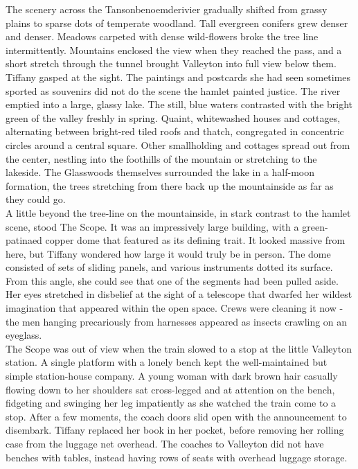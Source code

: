 The scenery across the Tansonbenoemderivier gradually shifted from grassy plains to sparse dots of temperate woodland.
Tall evergreen conifers grew denser and denser. 
Meadows carpeted with dense wild-flowers broke the tree line intermittently. 
Mountains enclosed the view when they reached the pass, and a short stretch through the tunnel brought Valleyton into full view below them.\\

Tiffany gasped at the sight. 
The paintings and postcards she had seen sometimes sported as souvenirs did not do the scene the hamlet painted justice.
The river emptied into a large, glassy lake. 
The still, blue waters contrasted with the bright green of the valley freshly in spring.
Quaint, whitewashed houses and cottages, alternating between bright-red tiled roofs and thatch, congregated in concentric circles around a central square.
Other smallholding and cottages spread out from the center, nestling into the foothills of the mountain or stretching to the lakeside.
The Glasswoods themselves surrounded the lake in a half-moon formation, the trees stretching from there back up the mountainside as far as they could go.\\

A little beyond the tree-line on the mountainside, in stark contrast to the hamlet scene, stood The Scope.
It was an impressively large building, with a green-patinaed copper dome that featured as its defining trait.
It looked massive from here, but Tiffany wondered how large it would truly be in person.
The dome consisted of sets of sliding panels, and various instruments dotted its surface.
From this angle, she could see that one of the segments had been pulled aside. 
Her eyes stretched in disbelief at the sight of a telescope that dwarfed her wildest imagination that appeared within the open space.
Crews were cleaning it now - the men hanging precariously from harnesses appeared as insects crawling on an eyeglass.\\

The Scope was out of view when the train slowed to a stop at the little Valleyton station. 
A single platform with a lonely bench kept the well-maintained but simple station-house company.
A young woman with dark brown hair casually flowing down to her shoulders sat cross-legged and at attention on the bench, fidgeting and swinging her leg impatiently as she watched the train come to a stop.
After a few moments, the coach doors slid open with the announcement to disembark. 
Tiffany replaced her book in her pocket, before removing her rolling case from the luggage net overhead.
The coaches to Valleyton did not have benches with tables, instead having rows of seats with overhead luggage storage.\\

